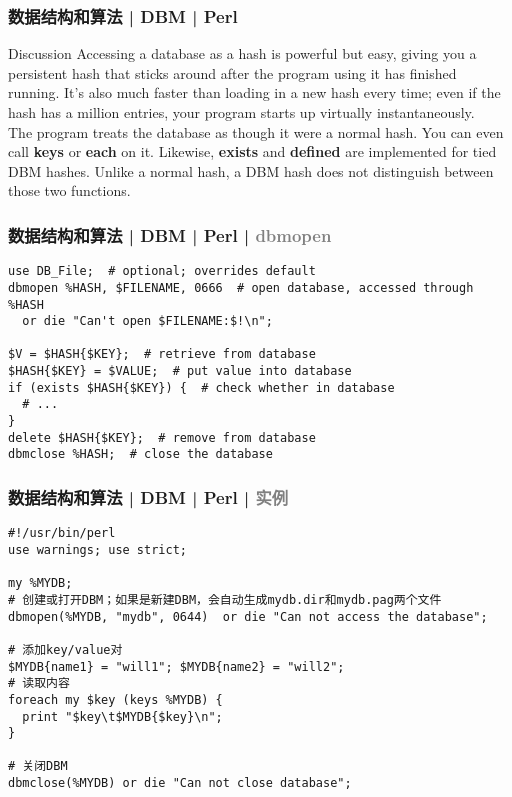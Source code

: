 \begin{frame}
  \frametitle{数据结构和算法 | DBM | Perl}
  \begin{block}{Discussion}
    Accessing a database as a hash is powerful but easy, giving you a persistent hash that sticks around after the program using it has finished running. It's also much faster than loading in a new hash every time; even if the hash has a million entries, your program starts up virtually instantaneously.\\
    \vspace{0.5em}
    The program treats the database as though it were a normal hash. You can even call \textbf{keys} or \textbf{each} on it. Likewise, \textbf{exists} and \textbf{defined} are implemented for tied DBM hashes. Unlike a normal hash, a DBM hash does not distinguish between those two functions.
  \end{block}
\end{frame}

\begin{frame}[fragile]
  \frametitle{数据结构和算法 | DBM | Perl | \textcolor{gray}{dbmopen}}
\begin{lstlisting}
use DB_File;  # optional; overrides default
dbmopen %HASH, $FILENAME, 0666  # open database, accessed through %HASH
  or die "Can't open $FILENAME:$!\n";

$V = $HASH{$KEY};  # retrieve from database
$HASH{$KEY} = $VALUE;  # put value into database
if (exists $HASH{$KEY}) {  # check whether in database
  # ...
}
delete $HASH{$KEY};  # remove from database
dbmclose %HASH;  # close the database
\end{lstlisting}
\end{frame}

\begin{frame}[fragile]
  \frametitle{数据结构和算法 | DBM | Perl | \textcolor{gray}{实例}}
  \vspace{-0.5em}
\begin{lstlisting}[basicstyle=\small\tt]
#!/usr/bin/perl
use warnings; use strict;
 
my %MYDB;
# 创建或打开DBM；如果是新建DBM，会自动生成mydb.dir和mydb.pag两个文件
dbmopen(%MYDB, "mydb", 0644)  or die "Can not access the database";

# 添加key/value对
$MYDB{name1} = "will1"; $MYDB{name2} = "will2";
# 读取内容
foreach my $key (keys %MYDB) {
  print "$key\t$MYDB{$key}\n";
}

# 关闭DBM
dbmclose(%MYDB) or die "Can not close database";
\end{lstlisting}
\end{frame}

